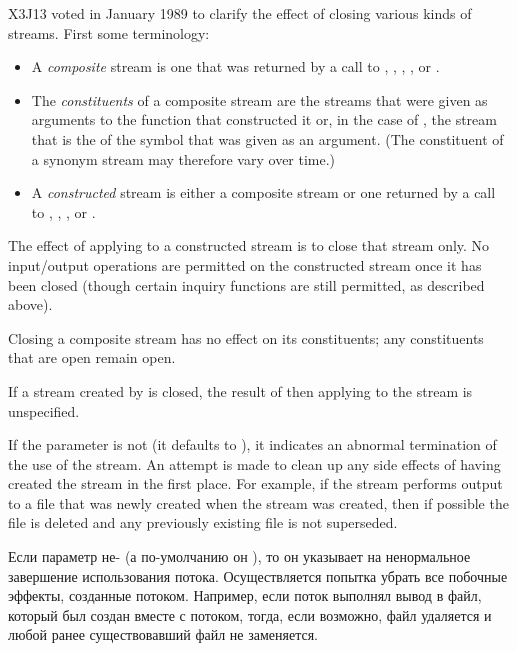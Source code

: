 \begin{defun}[Function]
\begin{new}
X3J13 voted in January 1989
to clarify the effect of closing various
kinds of streams.  First some terminology:
\begin{itemize}
\item
A \emph{composite} stream is one that was returned by a call to
,
,
,
,
or .

\item
The \emph{constituents} of a composite stream are the streams that were given
as arguments to the function that constructed it or, in the case of
, the stream that is the  of
the symbol that was given as an argument.  (The constituent of
a synonym stream may therefore vary over time.)

\item
A \emph{constructed} stream is either a composite stream or one returned
by a call to , ,
, or
.
\end{itemize}

The effect of applying  to a constructed stream is to close
that stream only.  No input/output operations are permitted on the
constructed stream once it has been closed (though certain inquiry
functions are still permitted, as described above).

Closing a composite stream has no effect on its constituents;
any constituents that are open remain open.

If a stream created by  is closed,
the result of then applying  to the
stream is unspecified.
\end{new}

If the  parameter is not {\false} (it defaults to {\false}), it
indicates an abnormal termination of the use of the stream.  An attempt
is made to clean up any side effects of having created the stream in the
first place.  For example, if the stream performs output to a file
that was newly created when the stream was created, then if possible the
file is deleted and any previously existing file is not superseded.

Если параметр  не-{\false} (а по-умолчанию он {\false}), то он
указывает на ненормальное завершение использования потока. Осуществляется
попытка убрать все побочные эффекты, созданные потоком. Например, если поток
выполнял вывод в файл, который был создан вместе с потоком, тогда, если
возможно, файл удаляется и любой ранее существовавший файл не заменяется.
\end{defun}


